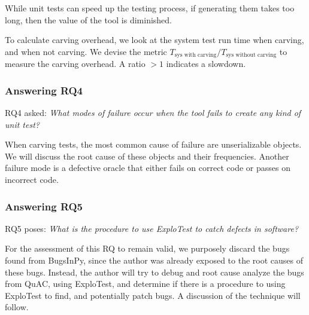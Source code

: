 While unit tests can speed up the testing process, if generating them takes too long, then the value of the tool is diminished.

To calculate carving overhead, we look at the system test run time when carving, and when not carving. We devise the metric $T_\text{sys with carving} / T_\text{sys without carving}$ to measure the carving overhead.
A ratio $> 1$ indicates a slowdown.


\subsubsection{Answering RQ4}
RQ4 asked: \textit{What modes of failure occur when the tool fails to create any kind of unit test?}

When carving tests, the most common cause of failure are unserializable objects. We will discuss the root
cause of these objects and their
frequencies. Another failure mode is a defective
oracle that either fails on correct code or passes on incorrect code.

\subsubsection{Answering RQ5}
RQ5 poses: \textit{What is the procedure to use ExploTest to catch defects in software?}

For the assessment of this RQ to remain valid, we purposely discard the bugs found from BugsInPy, since the
author was already exposed to the root
causes of these bugs.
Instead, the author will try to debug and root cause analyze the bugs from QuAC, using ExploTest, and
determine if there is a procedure to using
ExploTest to find, and potentially patch bugs. A discussion of the technique will follow.